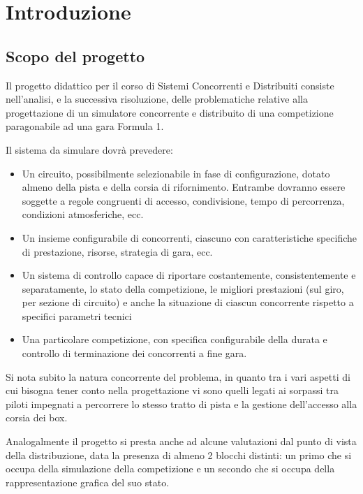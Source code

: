 \documentclass[a4paper,11pt, twoside]{book}
\begin{document}
  \chapter{Introduzione}
    \setcounter{page}{1}
    
    \section{Scopo del progetto}
      Il progetto didattico per il corso di Sistemi Concorrenti e Distribuiti consiste nell'analisi, e la
      successiva risoluzione,
      delle problematiche relative alla progettazione di un simulatore concorrente e distribuito 
      di una competizione paragonabile ad una gara Formula 1.
      
      Il sistema da simulare dovrà prevedere:
      \begin{itemize}
	\item Un circuito, possibilmente selezionabile in fase di configurazione, dotato almeno della pista e della corsia di 
	  rifornimento.
	  Entrambe dovranno essere soggette a regole congruenti di accesso, condivisione, 
	  tempo di percorrenza, condizioni atmosferiche, ecc.
	\item Un insieme configurabile di concorrenti, ciascuno con caratteristiche specifiche di prestazione, risorse, 
	  strategia di gara, ecc.
	\item Un sistema di controllo capace di riportare costantemente, consistentemente e separatamente, 
	  lo stato della competizione, le migliori prestazioni (sul giro, per sezione di circuito) e anche la 
	  situazione di ciascun concorrente rispetto a specifici parametri tecnici
	\item Una particolare competizione, con specifica configurabile della durata e controllo di terminazione 
	  dei concorrenti a fine gara.
      \end{itemize}
      
      Si nota subito la natura concorrente del problema, in quanto tra i vari aspetti di cui bisogna tener conto
      nella progettazione vi sono quelli legati ai sorpassi tra piloti impegnati a percorrere lo stesso tratto di pista
      e la gestione dell'accesso alla corsia dei box.
      
      Analogalmente il progetto si presta anche ad alcune valutazioni dal punto di vista della distribuzione, data
      la presenza di almeno 2 blocchi distinti: un primo che si occupa della simulazione della competizione e un secondo
      che si occupa della rappresentazione grafica del suo stato.
      
\end{document}
